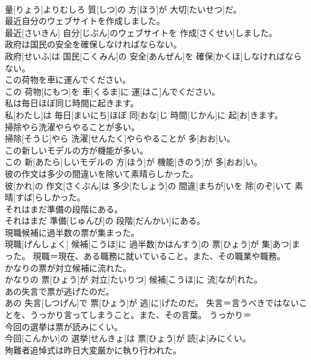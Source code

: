 \documentclass[8pt]{extreport}
\begin{document}
\begin{CJK}{UTF8}{min}
\\	量[りょう]よりむしろ 質[しつ]の 方[ほう]が 大切[たいせつ]だ。	
\\	最近自分のウェブサイトを作成しました。	
\\	最近[さいきん] 自分[じぶん]のウェブサイトを 作成[さくせい]しました。	
\\	政府は国民の安全を確保しなければならない。	
\\	政府[せいふ]は 国民[こくみん]の 安全[あんぜん]を 確保[かくほ]しなければならない。	
\\	この荷物を車に運んでください。	
\\	この 荷物[にもつ]を 車[くるま]に 運[はこ]んでください。	
\\	私は毎日ほぼ同じ時間に起きます。	
\\	私[わたし]は 毎日[まいにち]ほぼ 同[おな]じ 時間[じかん]に 起[お]きます。	
\\	掃除やら洗濯やらやることが多い。	
\\	掃除[そうじ]やら 洗濯[せんたく]やらやることが 多[おお]い。	
\\	この新しいモデルの方が機能が多い。	
\\	この 新[あたら]しいモデルの 方[ほう]が 機能[きのう]が 多[おお]い。	
\\	彼の作文は多少の間違いを除いて素晴らしかった。	
\\	彼[かれ]の 作文[さくぶん]は 多少[たしょう]の 間違[まちが]いを 除[のぞ]いて 素晴[すば]らしかった。	
\\	それはまだ準備の段階にある。	
\\	それはまだ 準備[じゅんび]の 段階[だんかい]にある。	
\\	現職候補に過半数の票が集まった。	
\\	現職[げんしょく] 候補[こうほ]に 過半数[かはんすう]の 票[ひょう]が 集[あつ]まった。	現職＝現在、ある職務に就いていること。また、その職業や職務。
\\	かなりの票が対立候補に流れた。	
\\	かなりの 票[ひょう]が 対立[たいりつ] 候補[こうほ]に 流[なが]れた。	
\\	あの失言で票が逃げたのだ。	
\\	あの 失言[しつげん]で 票[ひょう]が 逃[に]げたのだ。	失言＝言うべきではないことを、うっかり言ってしまうこと。また、その言葉。 うっかり＝ 
\\	今回の選挙は票が読みにくい。	
\\	今回[こんかい]の 選挙[せんきょ]は 票[ひょう]が 読[よ]みにくい。	
\\	殉難者追悼式は昨日大変厳かに執り行われた。	

\end{CJK}
\end{document}
